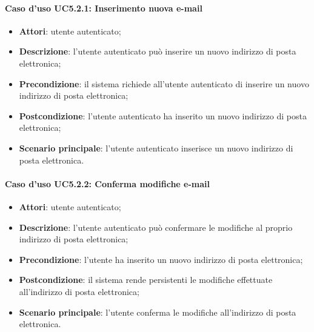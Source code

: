 \paragraph{Caso d'uso UC5.2.1: Inserimento nuova e-mail}

\begin{itemize}
	\item \textbf{Attori}: utente autenticato;
	\item \textbf{Descrizione}: l'utente autenticato può inserire un nuovo indirizzo di posta elettronica;
	\item \textbf{Precondizione}: il sistema richiede all'utente autenticato di inserire un nuovo indirizzo di posta elettronica;
	\item \textbf{Postcondizione}: l'utente autenticato ha inserito un nuovo indirizzo di posta elettronica;
	\item \textbf{Scenario principale}: l'utente autenticato inserisce un nuovo indirizzo di posta elettronica.
\end{itemize}

\paragraph{Caso d'uso UC5.2.2: Conferma modifiche e-mail}

\begin{itemize}
	\item \textbf{Attori}: utente autenticato;
	\item \textbf{Descrizione}: l'utente autenticato può confermare le modifiche al proprio indirizzo di posta elettronica;
	\item \textbf{Precondizione}: l'utente ha inserito un nuovo indirizzo di posta elettronica;
	\item \textbf{Postcondizione}: il sistema rende persistenti le modifiche effettuate all'indirizzo di posta elettronica;
	\item \textbf{Scenario principale}: l'utente conferma le modifiche all'indirizzo di posta elettronica.
\end{itemize}

